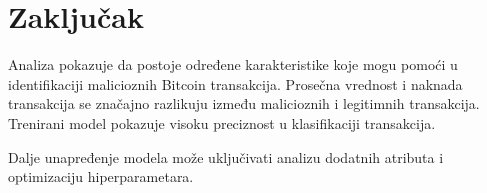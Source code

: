 \documentclass{article}
\begin{document}
\section{Zaključak}

Analiza pokazuje da postoje određene karakteristike koje mogu pomoći u identifikaciji malicioznih Bitcoin transakcija. Prosečna vrednost i naknada transakcija se značajno razlikuju između malicioznih i legitimnih transakcija. Trenirani model pokazuje visoku preciznost u klasifikaciji transakcija.

Dalje unapređenje modela može uključivati analizu dodatnih atributa i optimizaciju hiperparametara.
\end{document}
